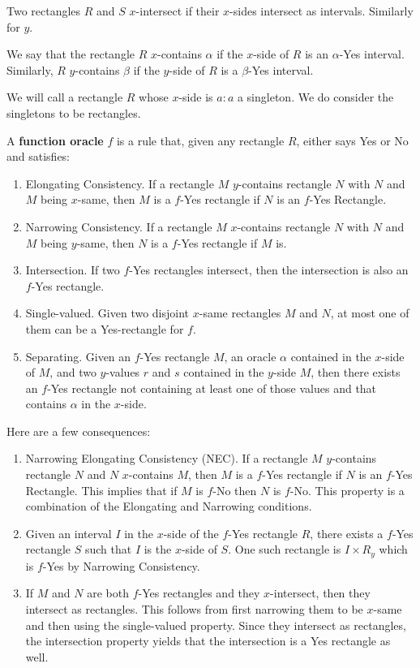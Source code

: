 \documentclass[12pt]{article}
\theoremstyle{remark}
\begin{document}
Two rectangles $R$ and $S$ $x$-intersect if their $x$-sides intersect as intervals. Similarly for $y$. 

We say that the rectangle $R$ $x$-contains $\alpha$ if the $x$-side of $R$ is an $\alpha$-Yes interval. Similarly, $R$ $y$-contains $\beta$ if the $y$-side of $R$ is a $\beta$-Yes interval.

We will call a rectangle $R$ whose $x$-side is $a:a$ a singleton. We do consider the singletons to be rectangles.

A \textbf{function oracle} $f$ is a rule that, given any rectangle $R$, either says Yes or No and satisfies: 
\begin{enumerate}
    \item Elongating Consistency. If a rectangle $M$ $y$-contains rectangle $N$ with $N$ and $M$ being $x$-same, then $M$ is a $f$-Yes rectangle if $N$  is an $f$-Yes Rectangle. 
    \item Narrowing Consistency. If a rectangle $M$ $x$-contains rectangle $N$ with $N$ and $M$ being $y$-same, then $N$ is a $f$-Yes rectangle if $M$ is. 
    \item Intersection. If two $f$-Yes rectangles intersect, then the intersection is also an $f$-Yes rectangle. 
    \item Single-valued. Given two disjoint $x$-same rectangles $M$ and $N$, at most one of them can be a Yes-rectangle for $f$. 
    \item Separating. Given an $f$-Yes rectangle $M$, an oracle $\alpha$ contained in the $x$-side of $M$, and two $y$-values $r$ and $s$ contained in the $y$-side $M$, then there exists an $f$-Yes rectangle not containing at least one of those values and that contains $\alpha$ in the $x$-side.
\end{enumerate} 

Here are a few consequences: 

\begin{enumerate}
    \item Narrowing Elongating Consistency (NEC). If a rectangle $M$ $y$-contains rectangle $N$ and $N$ $x$-contains $M$, then $M$ is a $f$-Yes rectangle if $N$  is an $f$-Yes Rectangle. This implies that if $M$ is $f$-No then $N$ is $f$-No. This property is a combination of the Elongating and Narrowing conditions. 

    \item Given an interval $I$ in the $x$-side of the $f$-Yes rectangle $R$, there exists a $f$-Yes rectangle $S$ such that $I$ is the $x$-side of $S$. One such rectangle is $I \times R_y$ which is $f$-Yes by Narrowing Consistency. 

    \item If $M$ and $N$ are both $f$-Yes rectangles and they $x$-intersect, then they intersect as rectangles. This follows from first narrowing them to be $x$-same and then using the single-valued property. Since they intersect as rectangles, the intersection property yields that the intersection is a Yes rectangle as well. 

\end{enumerate}
\end{document}
